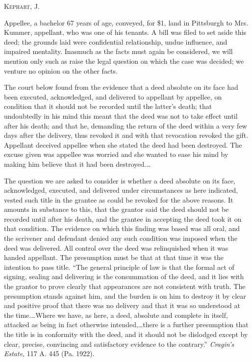 
\opinion \textsc{Kephart}, J.

Appellee, a bachelor 67 years of age, conveyed, for \$1, land in Pittsburgh to
Mrs. Kummer, appellant, who was one of his tenants. A bill was filed to set
aside this deed; the grounds laid were confidential relationship, undue
influence, and impaired mentality. Inasmuch as the facts must again be
considered, we will mention only such as raise the legal question on which the
case was decided; we venture no opinion on the other facts.

The court below found from the evidence that a deed absolute on its face had
been executed, acknowledged, and delivered to appellant by appellee, on
condition that it should not be recorded until the latter's death; that
undoubtedly in his mind this meant that the deed was not to take effect until
after his death; and that he, demanding the return of the deed within a very
few days after the delivery, thus revoked it and with that revocation revoked
the gift. Appellant deceived appellee when she stated the deed had been
destroyed. The excuse given was appellee was worried and she wanted to ease his
mind by making him believe that it had been destroyed.\dots

The question we are asked to consider is whether a deed absolute on its face,
acknowledged, executed, and delivered under circumstances as here indicated,
vested such title in the grantee as could be revoked for the above reasons. It
amounts in substance to this, that the grantor said the deed should not be
recorded until after his death, and the grantee in accepting the deed took it
on that condition. The evidence on which this finding was based was all oral,
and the scrivener and defendant denied any such condition was imposed when the
deed was delivered. All control over the deed was relinquished when it was
handed appellant. The presumption must be that at that time it was the
intention to pass title. ``The general principle of law is that the formal act
of signing, sealing and delivering is the consummation of the deed, and it lies
with the grantor to prove clearly that appearances are not consistent with
truth. The presumption stands against him, and the burden is on him to destroy
it by clear and positive proof that there was no delivery and that it was so
understood at the time.\dots Where we have, as here, a deed, absolute and
complete in itself, attacked as being in fact otherwise intended,\dots there
is a further presumption that the title is in conformity with the deed, and it
should not be dislodged except by clear, precise, convincing and satisfactory
evidence to the contrary.'' \textit{Cragin's Estate}, 117 A. 445 (Pa. 1922).

